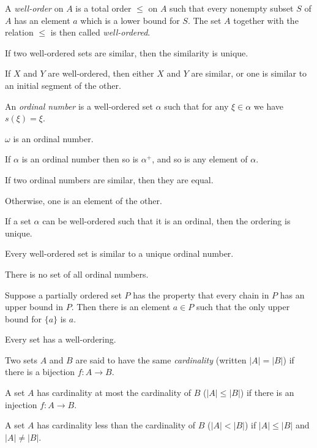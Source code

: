 \begin{defn}
  A \emph{well-order} on $A$ is a total order $\le$ on $A$ such that every
  nonempty subset $S$ of $A$ has an element $a$ which is a lower bound for $S$.
  The set $A$ together with the relation $\le$ is then called \emph{well-ordered}.
\end{defn}
\begin{prop}
  If two well-ordered sets are similar, then the similarity is unique.
\end{prop}
\begin{thm}
  If $X$ and $Y$ are well-ordered, then either $X$ and $Y$ are similar, or one
  is similar to an initial segment of the other.
\end{thm}
\begin{defn}
  An \emph{ordinal number} is a well-ordered set $\alpha$ such that for any
  $\xi\in\alpha$ we have $s(\xi)=\xi$.
\end{defn}
\begin{prop}
  $\omega$ is an ordinal number.
\end{prop}
\begin{prop}
  If $\alpha$ is an ordinal number then so is $\alpha^+$, and so is any element
  of $\alpha$.
\end{prop}
\begin{thm}
  If two ordinal numbers are similar, then they are equal.

  Otherwise, one is an element of the other.
\end{thm}
\begin{prop}
  If a set $\alpha$ can be well-ordered such that it is an ordinal, then the
  ordering is unique.
\end{prop}
\begin{prop}
  Every well-ordered set is similar to a unique ordinal number.
\end{prop}
\begin{prop}
  There is no set of all ordinal numbers.
\end{prop}
\begin{thm}
  Suppose a partially ordered set $P$ has the property that every chain in $P$
  has an upper bound in $P$. Then there is an element $a\in P$ such that the
  only upper bound for $\{a\}$ is $a$.
\end{thm}
\begin{thm}
  Every set has a well-ordering.
\end{thm}
\begin{defn}
  Two sets $A$ and $B$ are said to have the same \emph{cardinality} (written
  $|A|=|B|$) if there is a bijection $f:A\to B$.

  A set $A$ has cardinality at most the cardinality of $B$ ($|A|\le|B|$) if
  there is an injection $f:A\to B$.

  A set $A$ has cardinality less than the cardinality of $B$ ($|A|<|B|$) if
  $|A|\le|B|$ and $|A|\ne|B|$.
\end{defn}
